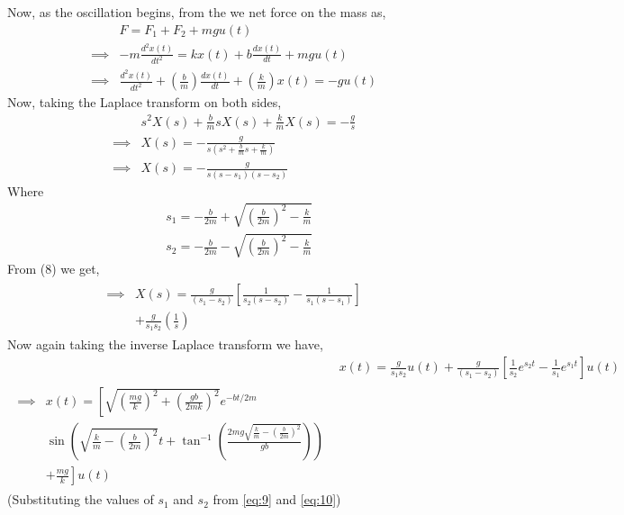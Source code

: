 \documentclass[journal,12pt,twocolumn]{IEEEtran}
\theoremstyle{remark}
\begin{document}
\begin{enumerate}
Now, as the oscillation begins, from the  we net force on the mass as,
\begin{align}
    &F=F_{1}+F_{2}+mgu(t) \label{eq:3}\\
    \implies &-m\frac{d^2x(t)}{dt^2}=kx(t)+b\frac{dx(t)}{dt}+mgu(t) \label{eq:4}\\
    \implies &\frac{d^2x(t)}{dt^2}+\left(\frac{b}{m}\right)\frac{dx(t)}{dt}+\left(\frac{k}{m}\right)x(t)=-gu(t) \label{eq:5}
\end{align}
Now, taking the Laplace transform on both sides,
\begin{align}
&s^2X(s)+\frac{b}{m}sX(s)+\frac{k}{m}X(s)=-\frac{g}{s} \label{eq:6}\\
\implies &X(s)=-\frac{g}{s\left(s^2+\frac{b}{m}s+\frac{k}{m}\right)} \label{eq:7}\\
\implies &X(s)=-\frac{g}{s(s-s_1)(s-s_2)} \label{eq:8}
\end{align}
Where
\begin{align}
&s_1=-\frac{b}{2m}+\sqrt{\left(\frac{b}{2m}\right)^2-\frac{k}{m}} \label{eq:9}\\
&s_2=-\frac{b}{2m}-\sqrt{\left(\frac{b}{2m}\right)^2-\frac{k}{m}} \label{eq:10}
\end{align}
From (8) we get,
\begin{align}
\begin{split}
\implies &X(s)=\frac{g}{(s_1-s_2)}\left[\frac{1}{s_2(s-s_2)}-\frac{1}{s_1(s-s_1)}\right] \\
&+\frac{g}{s_1s_2}\left(\frac{1}{s}\right) \label{eq:11}
\end{split}
\end{align}
Now again taking the inverse Laplace transform we have,
\begin{align}
&x(t)=\frac{g}{s_1s_2}u(t)+\frac{g}{(s_1-s_2)}\left[\frac{1}{s_2}e^{s_2t}-\frac{1}{s_1}e^{s_1t}\right]u(t)\label{eq:12}\\
\begin{split}
\implies &x(t)=\left[\sqrt{\left(\frac{mg}{k}\right)^2+\left(\frac{gb}{2mk}\right)^2}e^{-bt/2m}\right. \\
&\left.\sin{\left(\sqrt{\frac{k}{m}-\left(\frac{b}{2m}\right)^2}t+\tan^{-1}\left(\frac{2mg\sqrt{\frac{k}{m}-\left(\frac{b}{2m}\right)^2}}{gb}\right)\right)}\right. \\
&\left.+\frac{mg}{k}\right]u(t) \label{eq:13}
\end{split}
\end{align}
(Substituting the values of $s_1$ and $s_2$ from \eqref{eq:9} and \eqref{eq:10}) \\

\end{enumerate}
\end{document}
